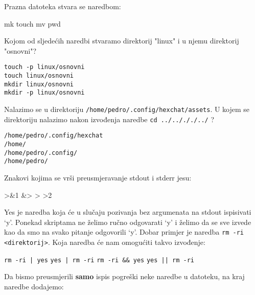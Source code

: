\documentclass[a4paper,11pt]{exam}
\newcommand{\shell}[1]{\texttt{#1}}
\begin{document}
\begin{questions}
	\question
  Prazna datoteka stvara se naredbom:

	\begin{oneparchoices}
		\choice mk
		\CorrectChoice touch
		\choice mv
		\choice pwd
	\end{oneparchoices}
	
	\question
	Kojom od sljedećih naredbi stvaramo direktorij "linux" i u njemu direktorij "osnovni"? 
	
	\begin{oneparchoices}
		\choice \shell{touch -p linux/osnovni} \\
		\choice \shell{touch linux/osnovni} \\
		\choice \shell{mkdir linux/osnovni} \\
		\CorrectChoice \shell{mkdir -p linux/osnovni}
	\end{oneparchoices}
	
	\question
  Nalazimo se u direktoriju \shell{/home/pedro/.config/hexchat/assets}. U kojem se direktoriju nalazimo nakon izvođenja naredbe  \shell{cd ../../././../} ? 

	\begin{oneparchoices}
		\choice \shell{/home/pedro/.config/hexchat} \\
		\choice \shell{/home/} \\
		\choice \shell{/home/pedro/.config/} \\
		\CorrectChoice \shell{/home/pedro/}
	\end{oneparchoices}
	
	\question
 Znakovi kojima se vrši preusmjeravanje stdout i stderr jesu: 
	\begin{oneparchoices}
		>\&1 
		\CorrectChoice \&> 
		\choice >
		\choice >2
	\end{oneparchoices}
	
	\question
Yes je naredba koja će u slučaju pozivanja bez argumenata na stdout ispisivati ‘y’. Ponekad skriptama ne želimo ručno odgovarati ‘y’ i želimo da se sve izvede kao da smo na svako pitanje odgovorili ‘y’. Dobar primjer je naredba \shell{rm -ri <direktorij>}. Koja naredba će nam omogućiti takvo izvođenje:
	
	\begin{oneparchoices}
		\choice \shell{rm -ri | yes} 
		\CorrectChoice \shell{yes | rm -ri} 
		\choice \shell{rm -ri \&\& yes} 
		\choice \shell{yes || rm -ri}
	\end{oneparchoices}
	
	\question
  Da bismo preusmjerili \textbf{samo} ispis pogreški neke naredbe u datoteku, na kraj naredbe dodajemo:


\end{questions}
\end{document}
